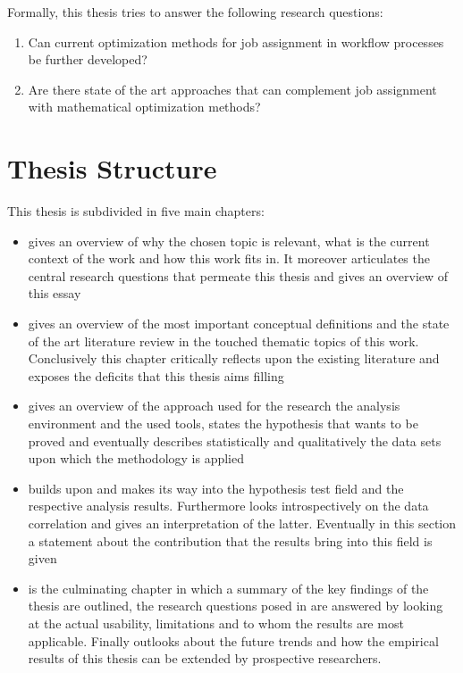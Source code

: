 \documentclass{seal_thesis}
\begin{document}
Formally, this thesis tries to answer the following research questions:

\begin{enumerate}[label=\textbf{RQ. \arabic*},ref=Research Question \arabic*]
\item Can current optimization methods for job assignment in workflow processes be further developed? \label{rq:one}
\item Are there state of the art approaches that can complement job assignment with mathematical optimization methods? \label{rq:two}
\end{enumerate}

\section{Thesis Structure}

This thesis is subdivided in five main chapters:

\begin{itemize}
	\item {} gives an overview of why the chosen topic is relevant, what is the current context of the work and how this work fits in. It moreover articulates the central research questions that permeate this thesis and gives an overview of this essay
	\item {} gives an overview of the most important conceptual definitions and the state of the art literature review in the touched thematic topics of this work. Conclusively this chapter critically reflects upon the existing literature and exposes the deficits that this thesis aims filling
	\item {} gives an overview of the approach used for the research \eg the analysis environment and the used tools, states the hypothesis that wants to be proved and eventually describes statistically and qualitatively the data sets upon which the methodology is applied
	\item {} builds upon  and makes its way into the hypothesis test field and the respective analysis results. Furthermore looks introspectively on the data correlation and gives an interpretation of the latter. Eventually in this section a statement about the contribution that the results bring into this field is given
	\item {} is the culminating chapter in which a summary of the key findings of the thesis are outlined, the research questions posed in  are answered by looking at the actual usability, limitations and to whom the results are most applicable. Finally outlooks about the future trends and how the empirical results of this thesis can be extended by prospective researchers.
\end{itemize}
\end{document}
